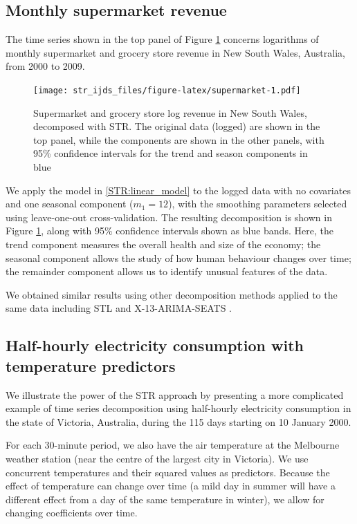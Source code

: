 \documentclass[11pt,a4paper,]{article}
\begin{document}
\hypertarget{ssec:simple}{%
\subsection{Monthly supermarket revenue}\label{ssec:simple}}

The time series shown in the top panel of Figure \ref{fig:supermarket} concerns logarithms of monthly supermarket and grocery store revenue in New South Wales, Australia, from 2000 to 2009.

\begin{figure}
\centering
\texttt{[image: str\_ijds\_files/figure-latex/supermarket-1.pdf]}
\caption{\label{fig:supermarket}Supermarket and grocery store log revenue in New South Wales, decomposed with STR. The original data (logged) are shown in the top panel, while the components are shown in the other panels, with 95\% confidence intervals for the trend and season components in blue}
\end{figure}

We apply the model in \eqref{STR:linear_model} to the logged data with no covariates and one seasonal component (\(m_1=12\)), with the smoothing parameters selected using leave-one-out cross-validation. The resulting decomposition is shown in Figure \ref{fig:supermarket}, along with 95\% confidence intervals shown as blue bands. Here, the trend component measures the overall health and size of the economy; the seasonal component allows the study of how human behaviour changes over time; the remainder component allows us to identify unusual features of the data.

We obtained similar results using other decomposition methods applied to the same data including STL \autocite{cleveland1990stl} and X-13-ARIMA-SEATS \autocite{findley2005some}.

\FloatBarrier

\hypertarget{sec:one_more_example}{%
\subsection{Half-hourly electricity consumption with temperature predictors}\label{sec:one_more_example}}

We illustrate the power of the STR approach by presenting a more complicated example of time series decomposition using half-hourly electricity consumption in the state of Victoria, Australia, during the 115 days starting on 10 January 2000.

For each 30-minute period, we also have the air temperature at the Melbourne weather station (near the centre of the largest city in Victoria). We use concurrent temperatures and their squared values as predictors. Because the effect of temperature can change over time (a mild day in summer will have a different effect from a day of the same temperature in winter), we allow for changing coefficients over time.
\end{document}
